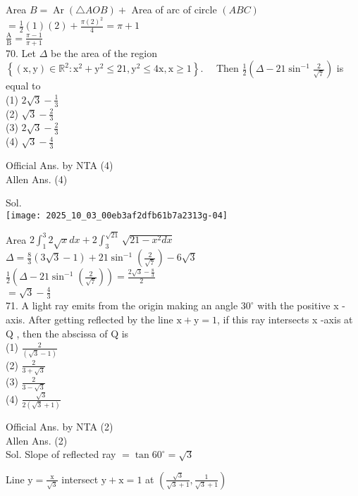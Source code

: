 \documentclass[10pt]{article}
\begin{document}
Area \(B=\operatorname{Ar}(\triangle A O B)+\) Area of arc of circle \((A B C)\)\\
\(=\frac{1}{2}(1)(2)+\frac{\pi(2)^{2}}{4}=\pi+1\)\\
\(\frac{\mathrm{A}}{\mathrm{B}}=\frac{\pi-1}{\pi+1}\)\\
70. Let \(\Delta\) be the area of the region\\
\(\left\{(\mathrm{x}, \mathrm{y}) \in \mathbb{R}^{2}: \mathrm{x}^{2}+\mathrm{y}^{2} \leq 21, \mathrm{y}^{2} \leq 4 \mathrm{x}, \mathrm{x} \geq 1\right\} . \quad\) Then \(\frac{1}{2}\left(\Delta-21 \sin ^{-1} \frac{2}{\sqrt{7}}\right)\) is equal to\\
(1) \(2 \sqrt{3}-\frac{1}{3}\)\\
(2) \(\sqrt{3}-\frac{2}{3}\)\\
(3) \(2 \sqrt{3}-\frac{2}{3}\)\\
(4) \(\sqrt{3}-\frac{4}{3}\)

Official Ans. by NTA (4)\\
Allen Ans. (4)

Sol.\\
\texttt{[image: 2025\_10\_03\_00eb3af2dfb61b7a2313g-04]}

Area \(2 \int_{1}^{3} 2 \sqrt{x} d x+2 \int_{3}^{\sqrt{21}} \sqrt{21-x^{2} d x}\)\\
\(\Delta=\frac{8}{3}(3 \sqrt{3}-1)+21 \sin ^{-1}\left(\frac{2}{\sqrt{7}}\right)-6 \sqrt{3}\)\\
\(\frac{1}{2}\left(\Delta-21 \sin ^{-1}\left(\frac{2}{\sqrt{7}}\right)\right)=\frac{2 \sqrt{3}-\frac{8}{3}}{2}\)\\
\(=\sqrt{3}-\frac{4}{3}\)\\
71. A light ray emits from the origin making an angle \(30^{\circ}\) with the positive x -axis. After getting reflected by the line \(\mathrm{x}+\mathrm{y}=1\), if this ray intersects x -axis at Q , then the abscissa of Q is\\
(1) \(\frac{2}{(\sqrt{3}-1)}\)\\
(2) \(\frac{2}{3+\sqrt{3}}\)\\
(3) \(\frac{2}{3-\sqrt{3}}\)\\
(4) \(\frac{\sqrt{3}}{2(\sqrt{3}+1)}\)

Official Ans. by NTA (2)\\
Allen Ans. (2)\\
Sol. Slope of reflected ray \(=\tan 60^{\circ}=\sqrt{3}\)

Line \(\mathrm{y}=\frac{\mathrm{x}}{\sqrt{3}}\) intersect \(\mathrm{y}+\mathrm{x}=1\) at \(\left(\frac{\sqrt{3}}{\sqrt{3}+1}, \frac{1}{\sqrt{3}+1}\right)\)
\end{document}
